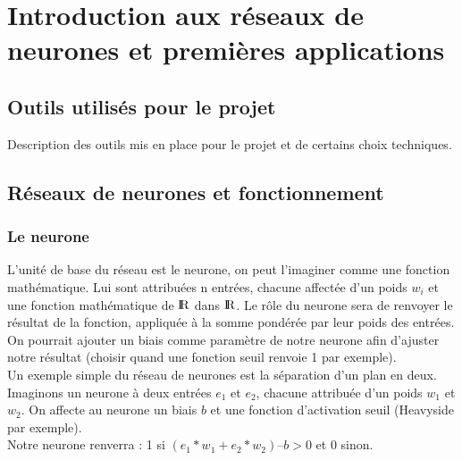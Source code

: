 


\chapter{Introduction aux réseaux de neurones et premières applications}

\section{Outils utilisés pour le projet}

Description des outils mis en place pour le projet et de certains choix techniques.

\section{Réseaux de neurones et fonctionnement}

\subsection{Le neurone} %
\label{sub:le_neurone}
L’unité de base du réseau est le neurone, on peut l’imaginer comme une fonction mathématique. Lui sont attribuées n entrées, chacune affectée d’un poids $w_i$ et une fonction mathématique de $\textrm{I\kern-0.21emR}$ dans $\textrm{I\kern-0.21emR}$. Le rôle du neurone sera de renvoyer le résultat de la fonction, appliquée à la somme pondérée par leur poids des entrées. On pourrait ajouter un biais comme paramètre de notre neurone afin d’ajuster notre résultat (choisir quand une fonction seuil renvoie 1 par exemple).\\

Un exemple simple du réseau de neurones est la séparation d’un plan en deux.\\
Imaginons un neurone à deux entrées $e_1$ et $e_2$, chacune attribuée d’un poids $w_1$ et $w_2$. On affecte au neurone un biais $b$ et une fonction d’activation seuil (Heavyside par exemple).\\
Notre neurone renverra : 1 si $(e_1*w_1+e_2*w_2) – b >0$ et 0 sinon.\\

